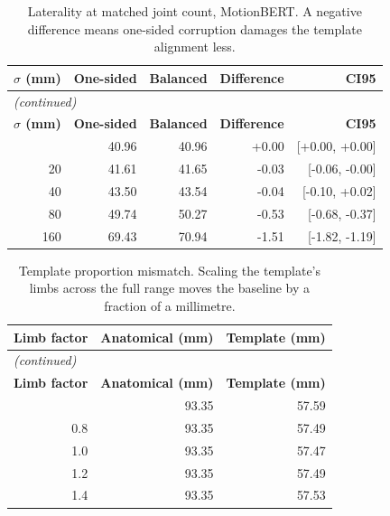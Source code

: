 \vspace{0.6cm}

\begin{center}
{\fontsize{10}{12}\selectfont
\begin{longtable}{rrrrr}
\caption{Laterality at matched joint count, MotionBERT. A negative difference means one-sided corruption damages the template alignment less.}\label{tab:applaterality_motionbert}\\
\hline
\textbf{$\sigma$ (mm)} & \textbf{One-sided} & \textbf{Balanced} & \textbf{Difference} & \textbf{CI95} \\
\hline
\endfirsthead
\multicolumn{5}{l}{\textit{(continued)}}\\
\hline
\textbf{$\sigma$ (mm)} & \textbf{One-sided} & \textbf{Balanced} & \textbf{Difference} & \textbf{CI95} \\
\hline
\endhead
\hline
\endfoot
0 & 40.96 & 40.96 & +0.00 & [+0.00, +0.00] \\
20 & 41.61 & 41.65 & -0.03 & [-0.06, -0.00] \\
40 & 43.50 & 43.54 & -0.04 & [-0.10, +0.02] \\
80 & 49.74 & 50.27 & -0.53 & [-0.68, -0.37] \\
160 & 69.43 & 70.94 & -1.51 & [-1.82, -1.19] \\
\end{longtable}
}
\end{center}

\vspace{0.6cm}

\begin{center}
{\fontsize{10}{12}\selectfont
\begin{longtable}{rrr}
\caption{Template proportion mismatch. Scaling the template's limbs across the full range moves the baseline by a fraction of a millimetre.}\label{tab:appmismatch}\\
\hline
\textbf{Limb factor} & \textbf{Anatomical (mm)} & \textbf{Template (mm)} \\
\hline
\endfirsthead
\multicolumn{3}{l}{\textit{(continued)}}\\
\hline
\textbf{Limb factor} & \textbf{Anatomical (mm)} & \textbf{Template (mm)} \\
\hline
\endhead
\hline
\endfoot
0.6 & 93.35 & 57.59 \\
0.8 & 93.35 & 57.49 \\
1.0 & 93.35 & 57.47 \\
1.2 & 93.35 & 57.49 \\
1.4 & 93.35 & 57.53 \\
\end{longtable}
}
\end{center}

